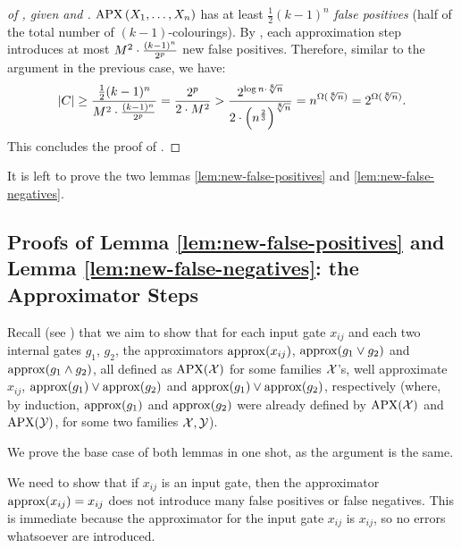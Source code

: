 \begin{proof}[of , given   and ]
\medskip 

\noindent{} $\operatorname{\mathrm{APX}}\left(X_1, \ldots, X_n\right)$ has at least $\frac{1}{2}(k-1)^n$ \emph{false positives} (half of the total number of  $(k-1)$-colourings).
By ,
each approximation step introduces at most $ M^2\cdot \frac{(k-1)^n}{2^p}$
 new false positives. Therefore,  similar to the argument  in the previous case, we have:
$$
|C| \geq \frac{\frac{1}{2}(k-1)^n}{M^2\cdot \frac{(k-1)^n}{2^p}}
= \frac{2^p}{2 \cdot M^2}
> \frac{2^{\log n\cdot \sqrt[8]{n}}}
    {2 \cdot \left(
        n^{\frac{2}{3}}
                \right)^{
                    \sqrt[8]{n}}
                    }
= n^{\Omega(\sqrt[8]{n})}
= 2^{\Omega(\sqrt[8]{n})}.
$$
This concludes the proof of .
\end{proof}
It is left to prove the two lemmas  \ref{lem:new-false-positives} and \ref{lem:new-false-negatives}. 





\subsection{Proofs of Lemma \ref{lem:new-false-positives} and Lemma \ref{lem:new-false-negatives}: the Approximator Steps}

Recall (see ) that we aim to show that for each input gate $x_{ij}$ and each two internal gates $g_1$, $g_2$, the approximators ${\rm approx}(x_{ij})$, 
${\rm approx}(g_1\lor g_2)$ and ${\rm approx}(g_1\land g_2)$, all defined as $\mathrm{APX}(\mathcal{X})$ for some families $\mathcal{X}$'s, well 
approximate $x_{ij}$, ${\rm approx}(g_1)\lor{\rm approx}(g_2)$ and ${\rm approx}(g_1)\lor{\rm approx}(g_2)$, respectively (where, by induction, ${\rm approx}(g_1)$ and $ {\rm approx}(g_2)$ were already defined by $\mathrm{APX}(\mathcal{X})$ and $\mathrm{APX}(\mathcal{Y})$, for some two families $\mathcal{X},\mathcal{Y}$).

We prove the base  case of  both lemmas in one shot, as the argument is the same.  

We need to show that if $x_{ij}$ is an input gate, then the approximator ${\rm approx}(x_{ij})=x_{ij}$ does not introduce many false positives or false negatives. 
%
This is immediate because the approximator for the input gate $x_{ij}$ is $x_{ij}$, so no errors whatsoever are introduced.  

